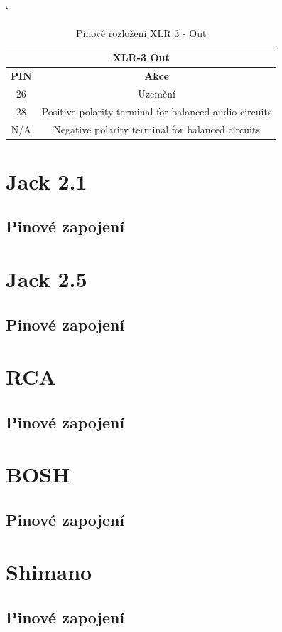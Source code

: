 \begin{table} [h!]
	\centering
	\catcode` %
	\begin{tabular}[c]{|| c | c ||}
	\hline
		\multicolumn{2}{||c||}{XLR-3 Out} \\
	\hline
 		 \textbf{PIN} & \textbf{Akce}\\
	\hline
		26 &  Uzemění\\
	\hline
		28 & Positive polarity terminal for balanced audio circuits \\
	\hline
		N/A & Negative polarity terminal for balanced circuits \\
	\hline
	\end{tabular}
	\caption{Pinové rozložení XLR 3 - Out}
	\label{table:pinXLR-OUT}
\end{table}

\section{Jack 2.1}
\subsection{Pinové zapojení}

\section{Jack 2.5}
\subsection{Pinové zapojení}

\section{RCA}
\subsection{Pinové zapojení}

\section{BOSH}
\subsection{Pinové zapojení}

\section{Shimano}
\subsection{Pinové zapojení}
